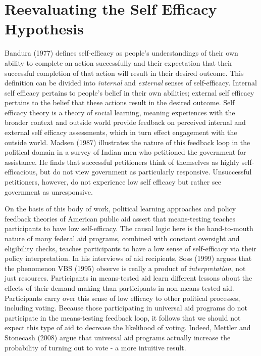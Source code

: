 \documentclass[12pt]{paper}
\begin{document}
\section{Reevaluating the Self Efficacy Hypothesis}
Bandura (1977) defines self-efficacy as people’s understandings of their own ability to complete an action successfully and their expectation that their successful completion of that action will result in their desired outcome. This definition can be divided into \textit{internal} and \textit{external} senses of self-efficacy. Internal self efficacy pertains to people's belief in their own abilities; external self efficacy pertains to the belief that these actions result in the desired outcome. Self efficacy theory is a theory of social learning, meaning experiences with the broader context and outside world provide feedback on perceived internal and external self efficacy assessments, which in turn effect engagement with the outside world. Madsen (1987) illustrates the nature of this feedback loop in the political domain in a survey of Indian men who petitioned the government for assistance. He finds that successful petitioners think of themselves as highly self-efficacious, but do not view government as particularly responsive. Unsuccessful petitioners, however, do not experience low self efficacy but rather see government as unresponsive.

On the basis of this body of work, political learning approaches and policy feedback theories of American public aid assert that means-testing teaches participants to have low self-efficacy. The causal logic here is the hand-to-mouth nature of many federal aid programs, combined with constant oversight and eligibility checks, teaches participants to have a low sense of self-efficacy via their policy interpretation. In his interviews of aid recipients, Soss (1999) argues that the phenomenon VBS (1995) observe is really a product of \textit{interpretation}, not just resources. Participants in means-tested aid learn different lessons about the effects of their demand-making than participants in non-means tested aid. Participants carry over this sense of low efficacy to other political processes, including voting. Because those participating in universal aid programs do not participate in the means-testing feedback loop, it follows that we should not expect this type of aid to decrease the likelihood of voting. Indeed, Mettler and Stonecash (2008) argue that universal aid programs actually increase the probability of turning out to vote - a more intuitive result.
\end{document}
